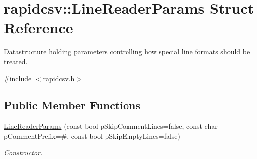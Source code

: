 \hypertarget{structrapidcsv_1_1LineReaderParams}{}\section{rapidcsv\+:\+:Line\+Reader\+Params Struct Reference}
\label{structrapidcsv_1_1LineReaderParams}


Datastructure holding parameters controlling how special line formats should be treated.  




{\ttfamily \#include $<$rapidcsv.\+h$>$}

\subsection*{Public Member Functions}
\begin{DoxyCompactItemize}
\item 
\hyperlink{structrapidcsv_1_1LineReaderParams_ac503972c8771dca468a07b670c4e5be5}{Line\+Reader\+Params} (const bool p\+Skip\+Comment\+Lines=false, const char p\+Comment\+Prefix=\textquotesingle{}\#\textquotesingle{}, const bool p\+Skip\+Empty\+Lines=false)
\begin{DoxyCompactList}\small\item\em Constructor. \end{DoxyCompactList}\end{DoxyCompactItemize}
